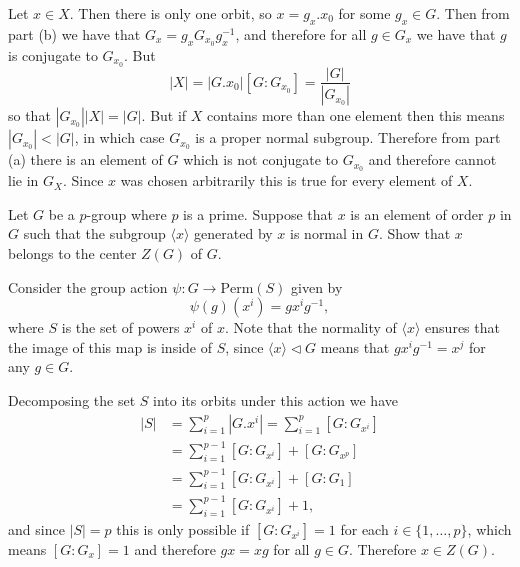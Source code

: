 \documentclass{article}
\newcounter{Problem}
\newenvironment{Problem}{\begin{Exercise}[name={Problem},
                                          counter={Problem}]}
                        {\end{Exercise}}
\begin{document}
\begin{Answer}
\begin{enumerate}[(a)]
{      Let $x \in X$. Then there is only one orbit, so
      $x = g_x . x_0$ for some $g_x \in G$. Then from part (b) we have
      that $G_x = g_x G_{x_0} g_x^{-1}$, and therefore for all $g \in
      G_x$ we have that $g$ is conjugate to $G_{x_0}$. But
      $$
      |X| = |G . x_0|[G : G_{x_0}] = \frac{|G|}{|G_{x_0}|}
      $$
      so that $|G_{x_0}| |X| = |G|$. But if $X$ contains more than one
      element then this means $|G_{x_0}| < |G|$, in which case
      $G_{x_0}$ is a proper normal subgroup. Therefore from part (a)
      there is an element of $G$ which is not conjugate to $G_{x_0}$
      and therefore cannot lie in $G_X$. Since $x$ was chosen
      arbitrarily this is true for every element of $X$.
    }
  \end{enumerate}
\end{Answer}

\pagebreak
\begin{Problem}
Let $G$ be a $p$-group where $p$ is a prime. Suppose that $x$ is an
element of order $p$ in $G$ such that the subgroup $\langle x \rangle$
generated by $x$ is normal in $G$. Show that $x$ belongs to the center
$Z(G)$ of $G$.
\end{Problem}

\begin{Answer}
Consider the group action $\psi : G \to \mathrm{Perm}(S)$ given by
$$
\psi(g)(x^i) = g x^i g^{-1},
$$
where $S$ is the set of powers $x^i$ of $x$. Note that the normality
of $\langle x \rangle$ ensures that the image of this map is inside of
$S$, since $\langle x \rangle \triangleleft G$ means that
$g x^i g^{-1} = x^j$ for any $g \in G$.

Decomposing the set $S$ into its orbits under this action we have
\begin{align*}
|S| &= \sum_{i=1}^p |G . x^i| = \sum_{i=1}^p [G : G_{x^i}] \\
    &= \sum_{i=1}^{p-1} [G : G_{x^i}] + [G : G_{x^p}] \\
    &= \sum_{i=1}^{p-1} [G : G_{x^i}] + [G : G_1] \\
    &= \sum_{i=1}^{p-1} [G : G_{x^i}] + 1,
\end{align*}
and since $|S| = p$ this is only possible if $[G : G_{x^i}] = 1$ for
each $i \in \{ 1, \dots, p \}$, which means $[G : G_x] = 1$ and
therefore $gx = xg$ for all $g \in G$. Therefore $x \in Z(G)$.


%
%
\end{Answer}
\end{document}
